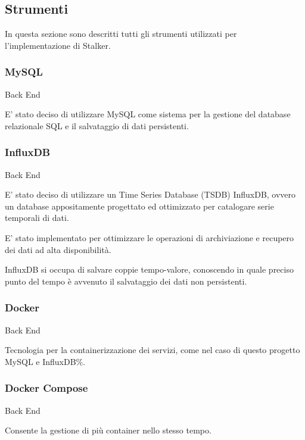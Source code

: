 \documentclass[../../../analisi-dei-requisiti.tex]{subfiles}
\begin{document}
\subsection{Strumenti}%
\label{sub:strumenti}
In questa sezione sono descritti tutti gli strumenti utilizzati per l'implementazione di Stalker.

\subsubsection{MySQL}%
\label{subs:mysql}
Back End

E' stato deciso di utilizzare MySQL come sistema per la gestione del database relazionale SQL e il salvataggio di dati persistenti.

\subsubsection{InfluxDB}%
\label{subs:influxdb}
Back End

E' stato deciso di utilizzare un Time Series Database (TSDB) InfluxDB, ovvero un database appositamente progettato ed ottimizzato per catalogare serie temporali di dati.

E' stato implementato per ottimizzare le operazioni di archiviazione e recupero dei dati ad alta disponibilità.

InfluxDB si occupa di salvare coppie tempo-valore, conoscendo in quale preciso punto del tempo è avvenuto il salvataggio dei dati non persistenti.

\subsubsection{Docker}%
\label{subs:docker}
Back End

Tecnologia per la containerizzazione dei servizi, come nel caso di questo progetto MySQL e InfluxDB\%.

\subsubsection{Docker Compose}%
\label{subs:docker_compose}
Back End

Consente la gestione di più container nello stesso tempo.

\end{document}
